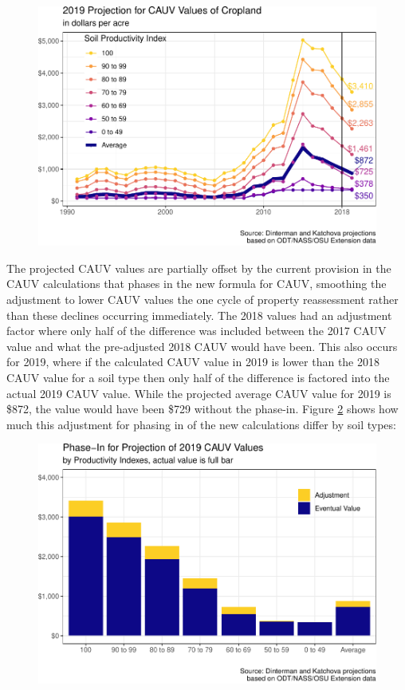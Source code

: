 \documentclass[]{article}
\begin{document}
\begin{figure}[H]
\includegraphics[width=1\linewidth]{4-projections-2019-2020_files/figure-latex/exp-trend-1} \caption{\label{fig:exp-trend}}\label{fig:exp-trend}
\end{figure}

The projected CAUV values are partially offset by the current provision
in the CAUV calculations that phases in the new formula for CAUV,
smoothing the adjustment to lower CAUV values the one cycle of property
reassessment rather than these declines occurring immediately. The 2018
values had an adjustment factor where only half of the difference was
included between the 2017 CAUV value and what the pre-adjusted 2018 CAUV
would have been. This also occurs for 2019, where if the calculated CAUV
value in 2019 is lower than the 2018 CAUV value for a soil type then
only half of the difference is factored into the actual 2019 CAUV value.
While the projected average CAUV value for 2019 is \$872, the value
would have been \$729 without the phase-in. Figure \ref{fig:exp-2019}
shows how much this adjustment for phasing in of the new calculations
differ by soil types:

\begin{figure}[H]
\includegraphics[width=1\linewidth]{4-projections-2019-2020_files/figure-latex/exp-2019-1} \caption{\label{fig:exp-2019}}\label{fig:exp-2019}
\end{figure}
\end{document}
